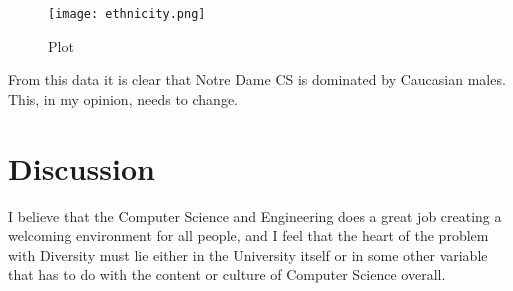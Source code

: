 \documentclass[letterpaper]{article}
\begin{document}
\begin{figure}[h!]
\centering
\texttt{[image: ethnicity.png]}
\caption{Plot}
\label{fig:Plot}
\end{figure}

From this data it is clear that Notre Dame CS is dominated by Caucasian males. This, in my opinion, needs to change.

\section*{Discussion}

I believe that the Computer Science and Engineering does a great job creating a welcoming environment for all people, and I feel that the heart of the problem with Diversity must lie either in the University itself or in some other variable that has to do with the content or culture of Computer Science overall.
\end{document}
